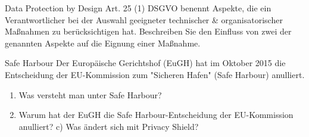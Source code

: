 \documentclass{exercisesheet}
\begin{document}
\begin{exercise*}{Data Protection by Design}
  Art. 25 (1) DSGVO benennt Aspekte, die ein Verantwortlicher bei der Auswahl geeigneter technischer \& organisatorischer Maßnahmen zu berücksichtigen hat. Beschreiben Sie den Einfluss von zwei der genannten Aspekte auf die Eignung einer Maßnahme.
\end{exercise*}

\begin{exercise*}{Safe Harbour}
  Der Europäische Gerichtshof (EuGH) hat im Oktober 2015 die Entscheidung der EU-Kommission zum "Sicheren Hafen" (Safe Harbour) anulliert.
  \begin{enumerate}
    \item Was versteht man unter Safe Harbour?
    \item Warum hat der EuGH die Safe Harbour-Entscheidung der EU-Kommission anulliert? c) Was ändert sich mit Privacy Shield?
  \end{enumerate}
\end{exercise*}
\end{document}
